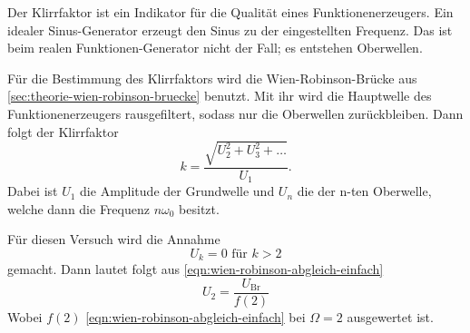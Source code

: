 Der Klirrfaktor ist ein Indikator für die Qualität eines Funktionenerzeugers. Ein idealer 
Sinus-Generator erzeugt den Sinus zu der eingestellten Frequenz. Das ist beim realen 
Funktionen-Generator nicht der Fall; es entstehen Oberwellen.

Für die Bestimmung des Klirrfaktors wird die Wien-Robinson-Brücke aus 
\autoref{sec:theorie-wien-robinson-bruecke} benutzt. Mit ihr wird die Hauptwelle des 
Funktionenerzeugers rausgefiltert, sodass nur die Oberwellen zurückbleiben. Dann folgt der
Klirrfaktor
\begin{equation}
	k = \frac{\sqrt{U_2^2 + U_3^2 + \hdots}}{U_1}.
	\label{eqn:klirrfaktor}
\end{equation}
Dabei ist $U_1$ die Amplitude der Grundwelle und $U_n$ die der n-ten Oberwelle, welche dann die
Frequenz $n\omega_0$ besitzt.

Für diesen Versuch wird die Annahme 
\begin{equation}
	U_k = 0 \text{ für } k > 2
	\label{eqn:klirrfaktor-annahme}
\end{equation}
gemacht. Dann lautet folgt aus \autoref{eqn:wien-robinson-abgleich-einfach}
\begin{equation}
	U_2 = \frac{U_\text{Br}}{f(2)}
	\label{eqn:klirrfaktor-u2}
\end{equation}
Wobei $f(2)$ \autoref{eqn:wien-robinson-abgleich-einfach} bei $\Omega = 2$ ausgewertet ist.

